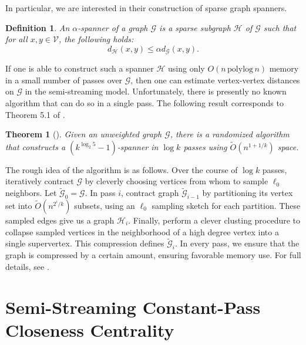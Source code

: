 \documentclass{report}
\newtheorem{theorem}{Theorem}[section]
\newtheorem{definition}{Definition}[section]
\newcommand{\polylog}{\, \mathrm{polylog} \,}
\begin{document}
In particular, we are interested in their construction of sparse graph spanners. 
%
\begin{definition}
An $\alpha$-spanner of a graph $\mathcal{G}$ is a sparse subgraph $\mathcal{H}$ of $\mathcal{G}$ such that for all $x,y \in \mathcal{V}$, the following holds: 
\begin{equation} \label{eq:spanner}
d_\mathcal{H}(x,y) \leq \alpha d_\mathcal{G}(x,y).
\end{equation}
\end{definition}
%
If one is able to construct such a spanner $\mathcal{H}$ using only $O(n \polylog n)$ memory in a small number of passes over $\mathcal{G}$, then one can estimate vertex-vertex distances on $\mathcal{G}$ in the semi-streaming model. 
Unfortunately, there is presently no known algorithm that can do so in a single pass. 
The following result corresponds to Theorem 5.1 of \cite{ahn2012graph}.
%
\begin{theorem}[\cite{ahn2012graph}] \label{thm:spanner}
Given an unweighted graph $\mathcal{G}$, there is a randomized algorithm that constructs a $(k^{\log_2 5}-1)$-spanner in $\log k$ passes using $\widetilde{O}(n^{1+1/k})$ space. 
\end{theorem}
%
The rough idea of the algorithm is as follows.
Over the course of $\log k$ passes, iteratively contract $\mathcal{G}$ by cleverly choosing vertices from whom to sample $\ell_0$ neighbors.
Let $\widetilde{\mathcal{G}}_0 = \mathcal{G}$. 
In pass $i$, contract graph $\widetilde{\mathcal{G}}_{i-1}$ by partitioning its vertex set into $\widetilde{O}(n^{2^i/k})$ subsets, using an $\ell_0$ sampling sketch for each partition. 
These sampled edges give us a graph $\mathcal{H}_i$. 
Finally, perform a clever clusting procedure to collapse sampled vertices in the neighborhood of a high degree vertex into a single supervertex.
This compression defines $\widetilde{\mathcal{G}}_i$. 
In every pass, we ensure that the graph is compressed by a certain amount, ensuring favorable memory use.
For full details, see \cite{ahn2012graph}.


\section{Semi-Streaming Constant-Pass Closeness Centrality} \label{sec:sscc}
\end{document}
